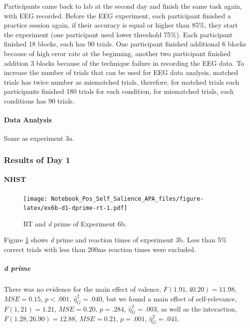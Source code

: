 \documentclass[
  english,
  man]{apa6}
\let\oldparagraph\paragraph
\renewcommand{\paragraph}[1]{\oldparagraph{#1}\mbox{}}
\let\oldsubparagraph\subparagraph
\renewcommand{\subparagraph}[1]{\oldsubparagraph{#1}\mbox{}}
\begin{document}
Participants came back to lab at the second day and finish the same task again, with EEG recorded. Before the EEG experiment, each participant finished a practice session again, if their accuracy is equal or higher than 85\%, they start the experiment (one participant used lower threshold 75\%). Each participant finished 18 blocks, each has 90 trials. One participant finished additional 6 blocks because of high error rate at the beginning, another two participant finished addition 3 blocks because of the technique failure in recording the EEG data. To increase the number of trials that can be used for EEG data analysis, matched trials has twice number as mismatched trials, therefore, for matched trials each participants finished 180 trials for each condition, for mismatched trials, each conditions has 90 trials.

\hypertarget{data-analysis-8}{%
\paragraph{Data Analysis}\label{data-analysis-8}}

Same as experiment 3a.

\hypertarget{results-of-day-1}{%
\subsubsection{Results of Day 1}\label{results-of-day-1}}

\hypertarget{nhst-5}{%
\paragraph{NHST}\label{nhst-5}}

\begin{figure}
\centering
\texttt{[image: Notebook\_Pos\_Self\_Salience\_APA\_files/figure-latex/ex6b-d1-dprime-rt-1.pdf]}
\caption{\label{fig:ex6b-d1-dprime-rt}RT and \emph{d} prime of Experiment 6b.}
\end{figure}

Figure \ref{fig:ex6b-d1-dprime-rt} shows \emph{d} prime and reaction times of experiment 3b. Less than 5\% correct trials with less than 200ms reaction times were excluded.

\hypertarget{d-prime-6}{%
\subparagraph{d prime}\label{d-prime-6}}

There was no evidence for the main effect of valence, \(F(1.91, 40.20) = 11.98\), \(\mathit{MSE} = 0.15\), \(p < .001\), \(\hat{\eta}^2_G = .040\), but we found a main effect of self-relevance, \(F(1, 21) = 1.21\), \(\mathit{MSE} = 0.20\), \(p = .284\), \(\hat{\eta}^2_G = .003\), as well as the interaction, \(F(1.28, 26.90) = 12.88\), \(\mathit{MSE} = 0.21\), \(p = .001\), \(\hat{\eta}^2_G = .041\).
\end{document}
